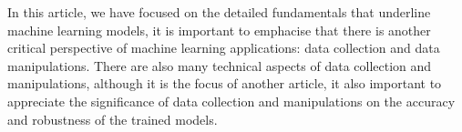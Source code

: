 
\par
In this article, we have focused on the detailed fundamentals that underline machine learning models, it is important to emphacise that there is another critical perspective of machine learning applications: data collection and data manipulations. There are also many technical aspects of data collection and manipulations, although it is the focus of another article, it also important to appreciate the significance of data collection and manipulations on the accuracy and robustness of the trained models.
\par 
